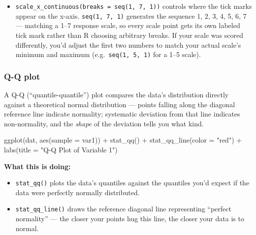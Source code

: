 \documentclass[
  letterpaper,
  DIV=11,
  numbers=noendperiod]{scrreprt}
\newenvironment{Shaded}{\begin{snugshade}}{\end{snugshade}}
\newcommand{\AttributeTok}[1]{\textcolor[rgb]{0.40,0.45,0.13}{#1}}
\newcommand{\FunctionTok}[1]{\textcolor[rgb]{0.28,0.35,0.67}{#1}}
\newcommand{\NormalTok}[1]{\textcolor[rgb]{0.00,0.23,0.31}{#1}}
\newcommand{\SpecialCharTok}[1]{\textcolor[rgb]{0.37,0.37,0.37}{#1}}
\newcommand{\StringTok}[1]{\textcolor[rgb]{0.13,0.47,0.30}{#1}}
\providecommand{\tightlist}{%
  \setlength{\itemsep}{0pt}\setlength{\parskip}{0pt}}\usepackage{longtable,booktabs,array}
\begin{document}
\begin{itemize}
\tightlist
\item
  \texttt{scale\_x\_continuous(breaks\ =\ seq(1,\ 7,\ 1))} controls
  where the tick marks appear on the x-axis. \texttt{seq(1,\ 7,\ 1)}
  generates the sequence 1, 2, 3, 4, 5, 6, 7 --- matching a 1--7
  response scale, so every scale point gets its own labeled tick mark
  rather than R choosing arbitrary breaks. If your scale was scored
  differently, you'd adjust the first two numbers to match your actual
  scale's minimum and maximum (e.g.~\texttt{seq(1,\ 5,\ 1)} for a 1--5
  scale).
\end{itemize}

\subsubsection{Q-Q plot}\label{q-q-plot}

A Q-Q (``quantile-quantile'') plot compares the data's distribution
directly against a theoretical normal distribution --- points falling
along the diagonal reference line indicate normality; systematic
deviation from that line indicates non-normality, and the \emph{shape}
of the deviation tells you what kind.

\begin{Shaded}
\begin{Highlighting}[]
\FunctionTok{ggplot}\NormalTok{(dat, }\FunctionTok{aes}\NormalTok{(}\AttributeTok{sample =}\NormalTok{ var1)) }\SpecialCharTok{+}
  \FunctionTok{stat\_qq}\NormalTok{() }\SpecialCharTok{+}
  \FunctionTok{stat\_qq\_line}\NormalTok{(}\AttributeTok{color =} \StringTok{"red"}\NormalTok{) }\SpecialCharTok{+}
  \FunctionTok{labs}\NormalTok{(}\AttributeTok{title =} \StringTok{"Q{-}Q Plot of Variable 1"}\NormalTok{)}
\end{Highlighting}
\end{Shaded}

\textbf{What this is doing:}

\begin{itemize}
\tightlist
\item
  \texttt{stat\_qq()} plots the data's quantiles against the quantiles
  you'd expect if the data were perfectly normally distributed.
\end{itemize}

\begin{itemize}
\tightlist
\item
  \texttt{stat\_qq\_line()} draws the reference diagonal line
  representing ``perfect normality'' --- the closer your points hug this
  line, the closer your data is to normal.
\end{itemize}
\end{document}
